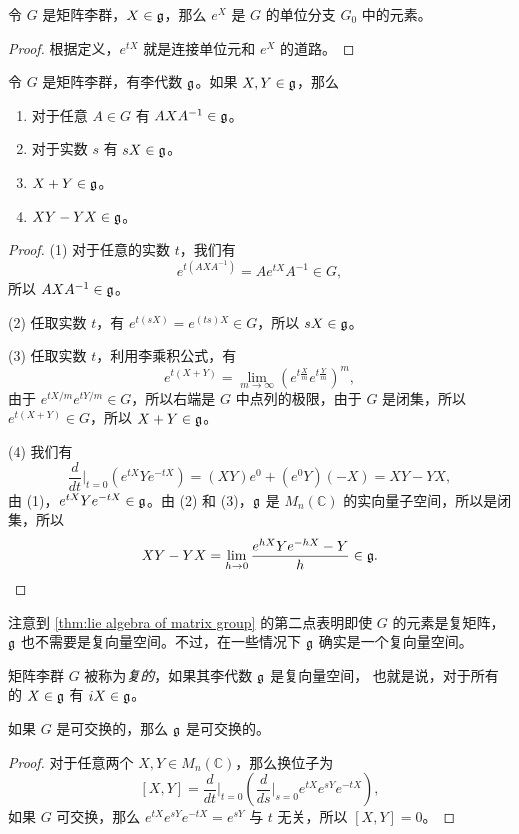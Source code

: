 \begin{proposition}
  令 $G$ 是矩阵李群，$X\in\mathfrak{g}$，那么 $e^X$ 是 $G$ 的单位分支 $G_0$
  中的元素。
\end{proposition}
\begin{proof}
  根据定义，$e^{tX}$ 就是连接单位元和 $e^X$ 的道路。
\end{proof}

\begin{theorem}\label{thm:lie algebra of matrix group}
  令 $G$ 是矩阵李群，有李代数 $\mathfrak{g}$。如果 $X,Y\in\mathfrak{g}$，那么
  \begin{enumerate}
    \item 对于任意 $A\in G$ 有 $AXA^{-1}\in\mathfrak{g}$。
    \item 对于实数 $s$ 有 $sX\in\mathfrak{g}$。
    \item $X+Y\in\mathfrak{g}$。
    \item $XY-YX\in\mathfrak{g}$。
  \end{enumerate}
\end{theorem}
\begin{proof}
  (1) 对于任意的实数 $t$，我们有
  \[
    e^{t(AXA^{-1})}=Ae^{tX}A^{-1}\in G,
  \]
  所以 $AXA^{-1}\in\mathfrak{g}$。

  (2) 任取实数 $t$，有 $
    e^{t(sX)}=e^{(ts)X}\in G
  $，所以 $sX\in\mathfrak{g}$。

  (3) 任取实数 $t$，利用李乘积公式，有
  \[
    e^{t(X+Y)}=\lim_{m\to\infty}\left(e^{t\frac{X}{m}}e^{t\frac{Y}{m}}\right)^m,
  \]
  由于 $e^{tX/m}e^{tY/m}\in G$，所以右端是 $G$ 中点列的极限，由于 $G$
  是闭集，所以 $e^{t(X+Y)}\in G$，所以 $X+Y\in\mathfrak{g} $。

  (4) 我们有
  \[
    \frac{d}{dt}\bigg|_{t=0}\left(e^{tX}Ye^{-tX}\right)=
    (XY)e^0+(e^0Y)(-X)=XY-YX,
  \]
  由 (1)，$e^{tX}Ye^{-tX}\in\mathfrak{g}$。由 (2) 和 (3)，$\mathfrak{g}$ 是
  $M_n(\mathbb C)$ 的实向量子空间，所以是闭集，所以
  \[
    XY-YX=\lim_{h\to 0}\frac{e^{hX}Ye^{-hX}- Y}{h}\in \mathfrak{g}.\qedhere
  \]
\end{proof}

注意到 \autoref{thm:lie algebra of matrix group} 的第二点表明即使
$G$ 的元素是复矩阵，$\mathfrak{g}$ 也不需要是复向量空间。不过，在一些情况下
$\mathfrak{g}$ 确实是一个复向量空间。

\begin{definition}
  矩阵李群 $G$ 被称为\emph{复的}，如果其李代数 $\mathfrak{g}$ 是复向量空间，
  也就是说，对于所有的 $X\in\mathfrak{g}$ 有 $iX\in\mathfrak{g}$。
\end{definition}

\begin{proposition}
  如果 $G$ 是可交换的，那么 $\mathfrak{g}$ 是可交换的。
\end{proposition}
\begin{proof}
  对于任意两个 $X,Y\in M_n(\mathbb{C})$，那么换位子为
  \[
    [X,Y]=\frac{d}{dt}\bigg|_{t=0}\left(\frac{d}{ds}\bigg|_{s=0}e^{tX}e^{sY}e^{-tX}\right),
  \]
  如果 $G$ 可交换，那么 $e^{tX}e^{sY}e^{-tX}=e^{sY}$ 与 $t$ 无关，所以 
  $[X,Y]=0$。
\end{proof}

